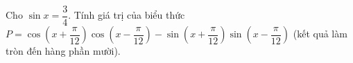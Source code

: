 \begin{ex}
Cho $\sin x=\dfrac34$. Tính giá trị của biểu thức $P=\cos\left(x+\dfrac{\pi}{12}\right)\cos\left(x-\dfrac{\pi}{12}\right)-\sin\left(x+\dfrac{\pi}{12}\right)\sin\left(x-\dfrac{\pi}{12}\right)$ (kết quả làm tròn đến hàng phần mười).
\end{ex}
